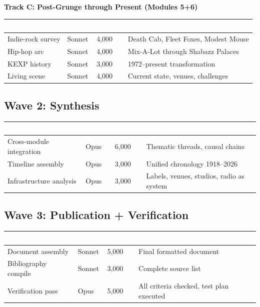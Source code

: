 \documentclass[11pt,letterpaper]{article}
\newcommand{\tableheader}[1]{\textbf{\sffamily\textcolor{white}{#1}}}
\begin{document}
\textbf{Track C: Post-Grunge through Present (Modules 5+6)}

\begin{center}
\begin{tabularx}{\textwidth}{L{3cm}L{2cm}C{1.5cm}X}
\toprule
{}
\tableheader{Task} & \tableheader{Model} & \tableheader{Tokens} & \tableheader{Output} \\
\midrule
Indie-rock survey & Sonnet & 4,000 & Death Cab, Fleet Foxes, Modest Mouse \\
Hip-hop arc & Sonnet & 4,000 & Mix-A-Lot through Shabazz Palaces \\
KEXP history & Sonnet & 3,000 & 1972--present transformation \\
Living scene & Sonnet & 4,000 & Current state, venues, challenges \\
\bottomrule
\end{tabularx}
\end{center}

\subsection{Wave 2: Synthesis}

\begin{center}
\begin{tabularx}{\textwidth}{L{3cm}L{2cm}C{1.5cm}X}
\toprule
{}
\tableheader{Task} & \tableheader{Model} & \tableheader{Tokens} & \tableheader{Output} \\
\midrule
Cross-module integration & Opus & 6,000 & Thematic threads, causal chains \\
Timeline assembly & Opus & 3,000 & Unified chronology 1918--2026 \\
Infrastructure analysis & Opus & 3,000 & Labels, venues, studios, radio as system \\
\bottomrule
\end{tabularx}
\end{center}

\subsection{Wave 3: Publication + Verification}

\begin{center}
\begin{tabularx}{\textwidth}{L{3cm}L{2cm}C{1.5cm}X}
\toprule
{}
\tableheader{Task} & \tableheader{Model} & \tableheader{Tokens} & \tableheader{Output} \\
\midrule
Document assembly & Sonnet & 5,000 & Final formatted document \\
Bibliography compile & Sonnet & 3,000 & Complete source list \\
Verification pass & Opus & 5,000 & All criteria checked, test plan executed \\
\bottomrule
\end{tabularx}
\end{center}
\end{document}

